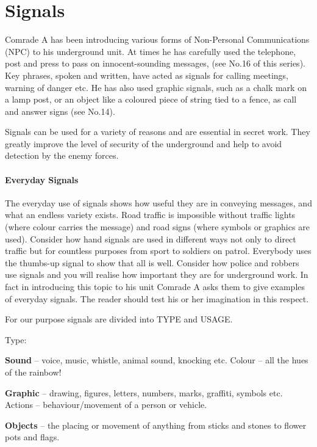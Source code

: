 \section{Signals}

Comrade A has been introducing various forms of Non-Personal
Communications (NPC) to his underground unit. At times he has carefully
used the telephone, post and press to pass on innocent-sounding
messages, (see No.16 of this series). Key phrases, spoken and written,
have acted as signals for calling meetings, warning of danger etc. He
has also used graphic signals, such as a chalk mark on a lamp post, or
an object like a coloured piece of string tied to a fence, as call and
answer signs (see No.14).

Signals can be used for a variety of reasons and are essential in secret
work. They greatly improve the level of security of the underground and
help to avoid detection by the enemy forces.

\paragraph{Everyday Signals}

The everyday use of signals shows how useful they are in conveying
messages, and what an endless variety exists. Road traffic is impossible
without traffic lights (where colour carries the message) and road signs
(where symbols or graphics are used). Consider how hand signals are used
in different ways not only to direct traffic but for countless purposes
from sport to soldiers on patrol. Everybody uses the thumbs-up signal to
show that all is well. Consider how police and robbers use signals and
you will realise how important they are for underground work. In fact in
introducing this topic to his unit Comrade A asks them to give examples
of everyday signals. The reader should test his or her imagination in
this respect.

For our purpose signals are divided into TYPE and USAGE.

{Type:}

\textbf{Sound} -- voice, music, whistle, animal sound, knocking etc.
Colour -- all the hues of the rainbow!

\textbf{Graphic} -- drawing, figures, letters, numbers, marks, graffiti,
symbols etc. Actions -- behaviour/movement of a person or vehicle.

\textbf{Objects} -- the placing or movement of anything from sticks and
stones to flower pots and flags.

